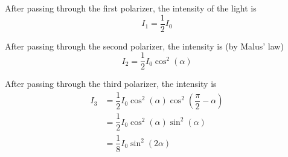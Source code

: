 \begin{custom-simple}[Problem 9]
After passing through the first polarizer, the intensity of the light is $$I_1=\dfrac{1}{2}I_0$$

After passing through the second polarizer, the intensity is (by Malus' law) $$I_2=\dfrac{1}{2}I_0\cos^2(\alpha)$$

After passing through the third polarizer, the intensity is
\begin{align*}
I_3&=\dfrac{1}{2}I_0\cos^2(\alpha)\cos^2\left(\dfrac{\pi}{2}-\alpha\right)\\
&=\dfrac{1}{2}I_0\cos^2(\alpha)\sin^2(\alpha)\\
&=\boxed{\dfrac{1}{8}I_0\sin^2(2\alpha)}
\end{align*}
\end{custom-simple}